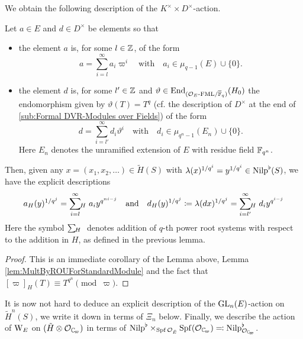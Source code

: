 \documentclass[../main.tex]{subfiles}
\begin{document}
We obtain the following description of the $K^\times \times D^\times$-action.

\begin{cor}\label{cor:ExplicitDescriptionOfActionOnUnivCov}
  Let $a \in E$ and $d \in D^\times$ be elements so that
  \begin{itemize}
    \item the element $a$ is, for some $l \in \mathbb{Z}$, of the form
      \begin{equation*}
        a = \sum_{i = l}^\infty a_i \varpi^i \quad \text{with} \quad
        a_i \in \mu_{q-1}(E) \cup \{0\}.
      \end{equation*}
    \item the element $d$ is, for some $l' \in \mathbb{Z}$ and 
      $\vartheta \in \operatorname{End}_{{({\mathcal{O}_E}\textnormal-\allowbreak\mathrm{FML}/{{\overline {\mathbb{F}}_q}})}} (H_0)$ the endomorphism given
      by $\vartheta(T) = T^q$ (cf. the description of $D^\times$ at the 
      end of \cref{sub:Formal DVR-Modules over Fields}) of the form
      \begin{equation*}
        d = \sum_{i = l'}^\infty d_i \vartheta^i \quad \text{with} \quad
        d_i \in \mu_{q^n-1}(E_n) \cup \{0\}.
      \end{equation*}
      Here $E_n$ denotes the unramified extension of $E$ with residue field 
      $\mathbb{F}_{q^n}$. 
  \end{itemize}
  Then, given any $x = (x_1, x_2, \dots)
  \in \tilde H(S)$ with $\lambda(x)^{1/q^i} = y^{1/q^i} \in {\mathrm{Nilp}}^\flat(S)$, we
  have the explicit descriptions
  \begin{equation*}
    a_H(y)^{1/q^j}  = \sum_{i=l}^\infty{\hspace{-3pt}}_H\hspace{3pt} a_i y^{q^{ni-j}}
  \quad \text{and} \quad
  d_H(y)^{1/q^j} \coloneqq \lambda(dx)^{1/q^j} = \sum_{i=l'}^\infty {\hspace{-3pt}}_H\hspace{3pt} d_i y^{q^{i-j}}
  \end{equation*}
  Here the symbol $\sum {\hspace{-3pt}}_H\hspace{3pt}$ \hspace{-10pt} denotes addition of $q$-th power
  root systems with
  respect to the addition in $H$, as defined in the previous lemma.
  \begin{proof}
    This is an immediate corollary of the Lemma above, Lemma
    \ref{lem:MultByROUForStandardModule} and the fact that 
    $[\varpi]_H(T) \equiv T^{q^n} \pmod \varpi$. 
  \end{proof}
\end{cor}

It is now not hard to deduce an explicit description of the $\operatorname{GL}_n(E)$-action
on $\tilde H^n(S)$, we write it down in terms of $\Xi_n$ below. Finally, we
describe the action of $\mathrm W_E$ on $(\tilde H \otimes \cO_\Cp)$ in terms
of $\Nilp^\flat \times_{\spf \cO_\br E} \Spf(\cO_\Cp) \eqcolon \Nilp^\flat_{\cO_\Cp}$.
\end{document}
